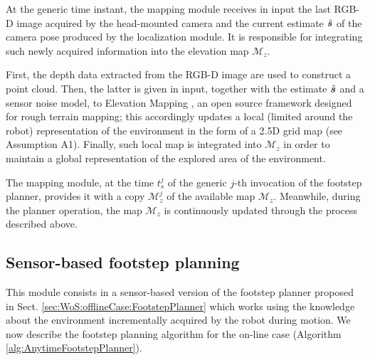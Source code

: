 At the generic time instant, the mapping module receives in input the last RGB-D image acquired by the head-mounted camera and the current estimate $\hat{{\bm{s}}}$ of the camera pose produced by the localization module. 
It is responsible for integrating such newly acquired information into the elevation map
$\mathcal{M}_z$.

First, the depth data extracted from the RGB-D image are used to construct a point cloud.
Then, the latter is given in input, together with the estimate $\hat{{\bm{s}}}$ and a sensor noise model, to Elevation Mapping \cite{Fankhauser2018ProbabilisticTerrainMapping}, an open source framework designed for rough terrain mapping; this accordingly updates a local (limited around the robot)
representation of the environment in the form of a 2.5D grid map (see Assumption A1).
Finally, such local map is integrated into $\mathcal{M}_z$ in order to maintain a global representation of the explored area of the environment.

The mapping module, at the time $t_s^j$ of the generic $j$-th invocation of the footstep planner, provides it with a copy $\mathcal{M}_z^j$ of the available map $\mathcal{M}_z$.
Meanwhile, during the planner operation, the map $\mathcal{M}_z$ is continuously updated through the process described above.

\subsection{Sensor-based footstep planning}
\label{sec:WoS:onlineCase:FootstepPlanner}

This module consists in a sensor-based version of the footstep planner proposed in Sect. \ref{sec:WoS:offlineCase:FootstepPlanner} which works using the knowledge about the environment incrementally acquired by the robot during motion. 
We now describe the footstep planning algorithm for the on-line case (Algorithm \ref{alg:AnytimeFootstepPlanner}).

